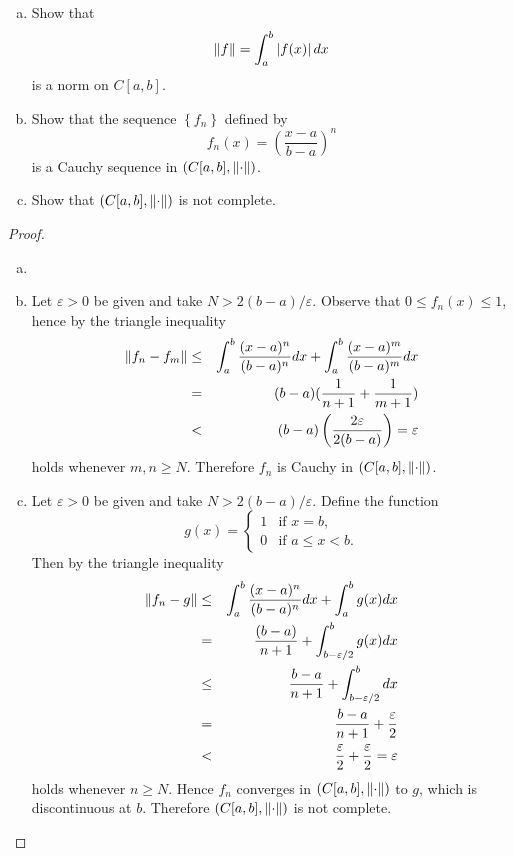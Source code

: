 \documentclass[10pt]{amsart}
\begin{document}
\begin{ex25}{}
  \begin{enumerate}[(a)]
  \item\label{25a}
    Show that 
    $$\lVert f\rVert = \int_a^b \left| f(x) \right|dx$$
    is a norm on $C[a,b]$.
  \item\label{25b}
    Show that the sequence $\left\{f_n\right\}$ defined by 
    $$f_n(x) = \left(\frac{x-a}{b-a}\right)^n$$
    is a Cauchy sequence in $(C[a,b], \lVert\cdot\rVert)$.
  \item\label{25c}
    Show that $(C[a,b], \lVert\cdot\rVert)$ is not complete.
  \end{enumerate}

  \begin{proof}
    \begin{enumerate}[(a)]
    \item
      
    \item
      Let $\varepsilon > 0$ be given and take $N > 2(b-a)/\varepsilon$.
      Observe that $0 \leq f_n(x) \leq 1$, hence by the triangle inequality
      \begin{eqnarray*}
        \lVert f_n - f_m\rVert &\leq& \int_a^b \frac{(x-a)^n}{(b-a)^n}dx + \int_a^b\frac{(x-a)^m}{(b-a)^m}dx\\
        &=& (b-a)(\frac{1}{n+1} + \frac{1}{m+1})\\
        &<& (b-a)\left(\frac{2\varepsilon}{2(b-a)}\right) = \varepsilon
        \end{eqnarray*}
      holds whenever $m,n \geq N$.
      Therefore $f_n$ is Cauchy in $(C[a,b], \lVert\cdot\rVert)$.
    \item
      Let $\varepsilon > 0$ be given and take $N > 2(b-a)/\varepsilon$.
      Define the function
      $$g(x) = 
      \left\{
      \begin{array}{ll}
        1 & \text{if } x = b,\\
        0 & \text{if } a \leq x < b.
      \end{array}
      \right.$$
      Then by the triangle inequality
      \begin{eqnarray*}
        \lVert f_n - g\rVert &\leq& \int_a^b \frac{(x-a)^n}{(b-a)^n}dx + \int_a^b g(x)dx\\
        &=& \frac{(b-a)}{n+1} + \int_{b-\varepsilon/2}^bg(x)dx\\
        &\leq& \frac{b-a}{n+1} + \int_{b-\varepsilon/2}^bdx\\
        &=& \frac{b-a}{n+1} + \frac{\varepsilon}{2}\\
        &<& \frac{\varepsilon}{2} + \frac{\varepsilon}{2} = \varepsilon
      \end{eqnarray*}
      holds whenever $n \geq N$.
      Hence $f_n$ converges in $(C[a,b], \lVert\cdot\rVert)$ to $g$, which is discontinuous at $b$.
      Therefore $(C[a,b], \lVert\cdot\rVert)$ is not complete.
    \end{enumerate}
  \end{proof}
\end{ex25}{}
\end{document}
